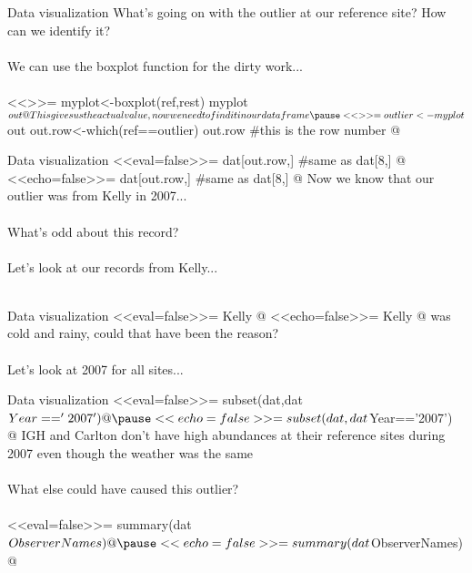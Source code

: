 \documentclass[xcolor=svgnames]{beamer}
\begin{document}
\begin{frame}[fragile]{Data visualization}
What's going on with the outlier at our reference site?  How can we identify it? \\~\\
We can use the boxplot function for the dirty work...\\~\\
\pause
<<>>=
myplot<-boxplot(ref,rest)
myplot$out
@
\vspace{0.2in}
This gives us the actual value, now we need to find it in our data frame \\~\\
\pause
<<>>=
outlier<-myplot$out
out.row<-which(ref==outlier) 
out.row #this is the row number
@
\end{frame}

\begin{frame}[fragile]{Data visualization}
<<eval=false>>=
dat[out.row,] #same as dat[8,]
@
\scriptsize
<<echo=false>>=
dat[out.row,] #same as dat[8,]
@
\vspace{0.2in}
\normalsize
Now we know that our outlier was from Kelly in 2007...\\~\\
What's odd about this record? \\~\\
\pause
Let's look at our records from Kelly...\\~\\
\end{frame}

\begin{frame}[fragile]{Data visualization}
<<eval=false>>=
Kelly
@
\scriptsize
<<echo=false>>=
Kelly
@
\normalsize
\vspace{0.2in}
 was cold and rainy, could that have been the reason?\\~\\
Let's look at 2007 for all sites...
\end{frame}

\begin{frame}[fragile]{Data visualization}
<<eval=false>>=
subset(dat,dat$Year=='2007')
@
\pause
\scriptsize
<<echo=false>>=
subset(dat,dat$Year=='2007')
@
\normalsize
\vspace{0.2in}
\pause
IGH and Carlton don't have high abundances at their reference sites during 2007 even though the weather was the same \\~\\
What else could have caused this outlier?\\~\\
\pause
<<eval=false>>=
summary(dat$ObserverNames)
@
\pause
\scriptsize
<<echo=false>>=
summary(dat$ObserverNames)
@
\end{frame}
\end{document}
